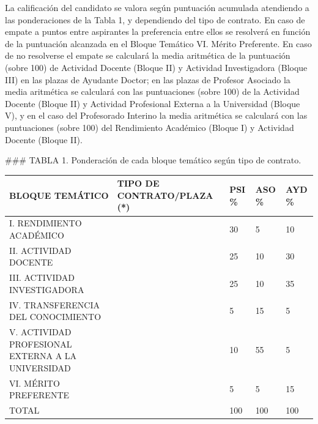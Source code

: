 \documentclass{article}
\begin{document}
\begin{itemize}
\begin{itemize}
\begin{scriptsize}
                  La calificación del candidato se valora según puntuación acumulada atendiendo a las ponderaciones de la Tabla 1, y dependiendo del tipo de contrato. En caso de empate a puntos entre aspirantes la preferencia entre ellos se resolverá en función de la puntuación alcanzada en el Bloque Temático VI. Mérito Preferente. En caso de no resolverse el empate se calculará la media aritmética de la puntuación (sobre 100) de Actividad Docente (Bloque II) y Actividad Investigadora (Bloque III) en las plazas de Ayudante Doctor; en las plazas de Profesor Asociado la media aritmética se calculará con las puntuaciones (sobre 100) de la Actividad Docente (Bloque II) y Actividad Profesional Externa a la Universidad (Bloque V), y en el caso del Profesorado Interino la media aritmética se calculará con las puntuaciones (sobre 100) del Rendimiento Académico (Bloque I) y Actividad Docente (Bloque II).

                  \#\#\# TABLA 1. Ponderación de cada bloque temático según tipo de contrato.

                  \vspace{0.4cm}
                  \begin{table}[h!]\centering\renewcommand{\arraystretch}{1.3}
                    \begin{tabular}{|p{}|p{}|p{}|p{}|p{}|}\hline
                      BLOQUE TEMÁTICO                                   & TIPO DE CONTRATO/PLAZA (*) & PSI \% & ASO \% & AYD \% \\\hline
                      I. RENDIMIENTO ACADÉMICO                          &                            & 30     & 5      & 10     \\\hline
                      II. ACTIVIDAD DOCENTE                             &                            & 25     & 10     & 30     \\\hline
                      III. ACTIVIDAD INVESTIGADORA                      &                            & 25     & 10     & 35     \\\hline
                      IV. TRANSFERENCIA DEL CONOCIMIENTO                &                            & 5      & 15     & 5      \\\hline
                      V. ACTIVIDAD PROFESIONAL EXTERNA A LA UNIVERSIDAD &                            & 10     & 55     & 5      \\\hline
                      VI. MÉRITO PREFERENTE                             &                            & 5      & 5      & 15     \\\hline
                      TOTAL                                             &                            & 100    & 100    & 100    \\\hline
                    \end{tabular}\end{table}
                  \vspace{0.4cm}


\end{scriptsize}
\end{itemize}
\end{itemize}
\end{document}
